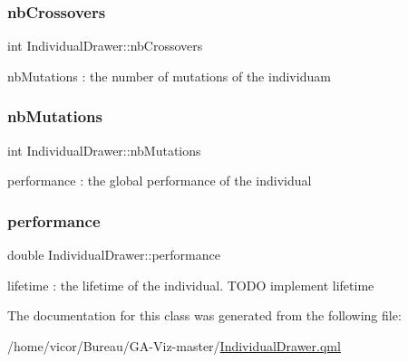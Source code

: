 \subsubsection{\texorpdfstring{nb\+Crossovers}{nbCrossovers}}
{\footnotesize\ttfamily int Individual\+Drawer\+::nb\+Crossovers}

nb\+Mutations \+: the number of mutations of the individuam \mbox{\label{class_individual_drawer_ac2d3ea0b17000b0c1e23b6a3859bdf4e}} 
\subsubsection{\texorpdfstring{nb\+Mutations}{nbMutations}}
{\footnotesize\ttfamily int Individual\+Drawer\+::nb\+Mutations}

performance \+: the global performance of the individual \mbox{\label{class_individual_drawer_a7d7dc8a2d50bab0ede8b3c9fad4976ac}} 
\subsubsection{\texorpdfstring{performance}{performance}}
{\footnotesize\ttfamily double Individual\+Drawer\+::performance}

lifetime \+: the lifetime of the individual. T\+O\+DO implement lifetime 

The documentation for this class was generated from the following file\+:\begin{DoxyCompactItemize}
\item 
/home/vicor/\+Bureau/\+G\+A-\/\+Viz-\/master/\hyperlink{_individual_drawer_8qml}{Individual\+Drawer.\+qml}\end{DoxyCompactItemize}
